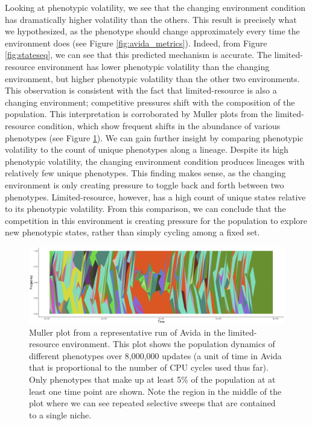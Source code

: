 \documentclass[letterpaper]{article}
\begin{document}
Looking at phenotypic volatility, we see that the changing environment condition has dramatically higher volatility than the others. This result is precisely what we hypothesized, as the phenotype should change approximately every time the environment does (see Figure \ref{fig:avida_metrics}). Indeed, from Figure \ref{fig:stateseq}, we can see that this predicted mechanism is accurate. The limited-resource environment has lower phenotypic volatility than the changing environment, but higher phenotypic volatility than the other two environments. This observation is consistent with the fact that limited-resource is also a changing environment; competitive pressures shift with the composition of the population. This interpretation is corroborated by Muller plots from the limited-resource condition, which show frequent shifts in the abundance of various phenotypes (see Figure \ref{fig:mullerlimres}). We can gain further insight by comparing phenotypic volatility to the count of unique phenotypes along a lineage. Despite its high phenotypic volatility, the changing environment condition produces lineages with relatively few unique phenotypes. This finding makes sense, as the changing environment is only creating pressure to toggle back and forth between two phenotypes. Limited-resource, however, has a high count of unique states relative to its phenotypic volatility. From this comparison, we can conclude that the competition in this environment is creating pressure for the population to explore new phenotypic states, rather than simply cycling among a fixed set.

\begin{figure}
    \centering
    \includegraphics[width=\linewidth]{figs/Mullerhighres-cropped.png}
    \caption{\small Muller plot from a representative run of Avida in the limited-resource environment. This plot shows the population dynamics of different phenotypes over 8,000,000 updates (a unit of time in Avida that is proportional to the number of CPU cycles used thus far). Only phenotypes that make up at least 5\% of the population at at least one time point are shown. Note the region in the middle of the plot where we can see repeated selective sweeps that are contained to a single niche.}
    \label{fig:mullerlimres}
\end{figure}
\end{document}
